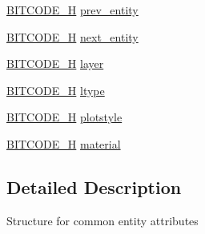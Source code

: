 \begin{DoxyCompactItemize}
\item 
\hyperlink{dwg_8h_a7c700e94e047a97ba8c24bdfe4029dc3}{\-B\-I\-T\-C\-O\-D\-E\-\_\-\-H} \hyperlink{struct__dwg__object__entity_a4f039d1120d74e075331265c44269bd1}{prev\-\_\-entity}
\item 
\hyperlink{dwg_8h_a7c700e94e047a97ba8c24bdfe4029dc3}{\-B\-I\-T\-C\-O\-D\-E\-\_\-\-H} \hyperlink{struct__dwg__object__entity_ae3873dc4bada6d74faba15683c3983e0}{next\-\_\-entity}
\item 
\hyperlink{dwg_8h_a7c700e94e047a97ba8c24bdfe4029dc3}{\-B\-I\-T\-C\-O\-D\-E\-\_\-\-H} \hyperlink{struct__dwg__object__entity_a959cb498e7a7ac7a5b10dd970278f5d0}{layer}
\item 
\hyperlink{dwg_8h_a7c700e94e047a97ba8c24bdfe4029dc3}{\-B\-I\-T\-C\-O\-D\-E\-\_\-\-H} \hyperlink{struct__dwg__object__entity_a752885759ca0a0e3c9a2fe5894305b21}{ltype}
\item 
\hyperlink{dwg_8h_a7c700e94e047a97ba8c24bdfe4029dc3}{\-B\-I\-T\-C\-O\-D\-E\-\_\-\-H} \hyperlink{struct__dwg__object__entity_aae8182ee21b21bba760b94caad118cbb}{plotstyle}
\item 
\hyperlink{dwg_8h_a7c700e94e047a97ba8c24bdfe4029dc3}{\-B\-I\-T\-C\-O\-D\-E\-\_\-\-H} \hyperlink{struct__dwg__object__entity_a7fff2e18aac9b80e4e0637baaab53b50}{material}
\end{DoxyCompactItemize}


\subsection{\-Detailed \-Description}
\-Structure for common entity attributes 


